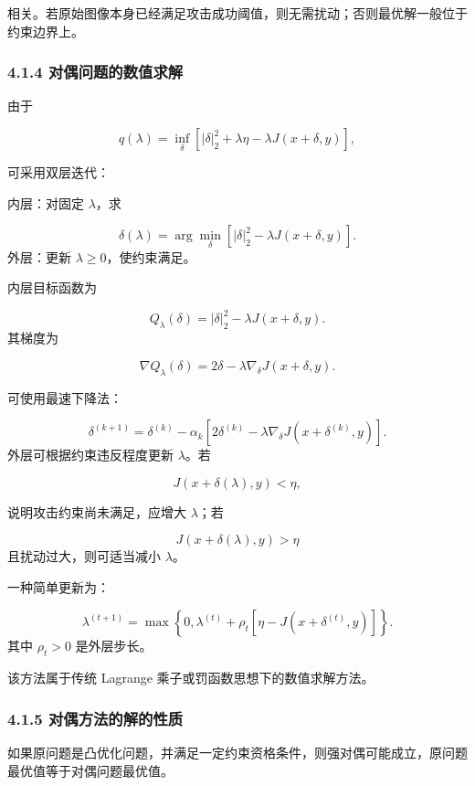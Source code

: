 ﻿\documentclass[UTF8,zihao=-4,fontset=none]{ctexart}
\begin{document}
相关。若原始图像本身已经满足攻击成功阈值，则无需扰动；否则最优解一般位于约束边界上。

\subsubsection*{4.1.4 对偶问题的数值求解}
{}

由于

\[
q(\lambda)
=
\inf_{\delta}
\left[
|\delta|_2^2
+
\lambda\eta
-
\lambda J(x+\delta,y)
\right],
\]

可采用双层迭代：

内层：对固定 \(\lambda\)，求

\[
\delta(\lambda)
=
\arg\min_\delta
\left[
|\delta|_2^2
-
\lambda J(x+\delta,y)
\right].
\]
\noindent 外层：更新 \(\lambda\ge0\)，使约束满足。

内层目标函数为

\[
Q_\lambda(\delta)
=
|\delta|_2^2
-
\lambda J(x+\delta,y).
\]
\noindent 其梯度为

\[
\nabla Q_\lambda(\delta)
=
2\delta-\lambda\nabla_\delta J(x+\delta,y).
\]

可使用最速下降法：

\[
\delta^{(k+1)}
=
\delta^{(k)}
-
\alpha_k
\left[
2\delta^{(k)}
-
\lambda\nabla_\delta J(x+\delta^{(k)},y)
\right].
\]
\noindent 外层可根据约束违反程度更新 \(\lambda\)。若

\[
J(x+\delta(\lambda),y)<\eta,
\]

说明攻击约束尚未满足，应增大 \(\lambda\)；若

\[
J(x+\delta(\lambda),y)>\eta
\]
\noindent 且扰动过大，则可适当减小 \(\lambda\)。

一种简单更新为：

\[
\lambda^{(t+1)}
=
\max\left\{
0,\lambda^{(t)}
+\rho_t[\eta-J(x+\delta^{(t)},y)]
\right\}.
\]
\noindent 其中 \(\rho_t>0\) 是外层步长。

该方法属于传统 Lagrange 乘子或罚函数思想下的数值求解方法。

\subsubsection*{4.1.5 对偶方法的解的性质}
{}

如果原问题是凸优化问题，并满足一定约束资格条件，则强对偶可能成立，原问题最优值等于对偶问题最优值。
\end{document}
